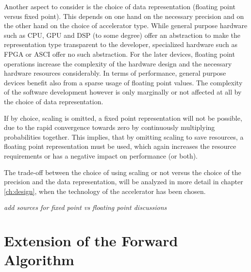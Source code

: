 \documentclass[mscthesis]{usiinfthesis}
\begin{document}
Another aspect to consider is the choice of data representation (floating point
versus fixed point). This depends on one hand on the necessary precision and on
the other hand on the choice of accelerator type.  While general purpose
hardware such as CPU, GPU and DSP (to some degree) offer an abstraction to make
the representation type transparent to the developer, specialized hardware such
as FPGA or ASCI offer no such abstraction. For the later devices, floating
point operations increase the complexity of the hardware design and the
necessary hardware resources considerably. In terms of performance, general
purpose devices benefit also from a sparse usage of floating point values. The
complexity of the software development however is only marginally or not
affected at all by the choice of data representation.

If by choice, scaling is omitted, a fixed point representation will not be
possible, due to the rapid convergence towards zero by continuously multiplying
probabilities together. This implies, that by omitting scaling to save
resources, a floating point representation must be used, which again increases
the resource requirements or has a negative impact on performance (or both).

The trade-off between the choice of using scaling or not versus the choice of
the precision and the data representation, will be analyzed in more detail in
chapter \ref{ch:design}, when the technology of the accelerator has been
chosen.

\emph{\color{red}add sources for fixed point vs floating point discussions}

\section{Extension of the Forward Algorithm}
\label{ch:analysis_extension}
\end{document}
